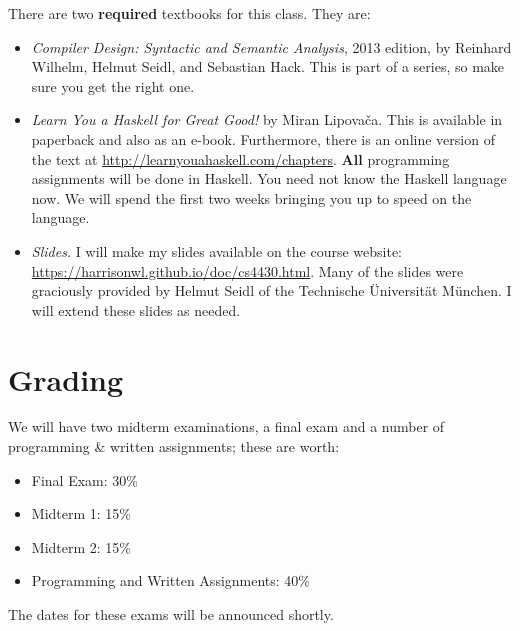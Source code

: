 \documentclass[11pt]{article}
\begin{document}
There are two {\bf{required}} textbooks for this class. They are:
\begin{itemize}
\item {\it Compiler Design: Syntactic and Semantic Analysis}, 2013 edition, by Reinhard Wilhelm, Helmut Seidl, and Sebastian Hack. This is part of a series, so make sure you get the right one.

\item {\it Learn You a Haskell for Great Good!} by Miran Lipova\v{c}a. This is available in  paperback and also as an e-book. Furthermore,  there is an online version of the text at \url{http://learnyouahaskell.com/chapters}. {\bf All} programming assignments will be done in Haskell. You need not know the Haskell language now. We will spend the first two weeks bringing you up to speed on the language.

\item {\it Slides.} I will make my slides available on the course website: \url{https://harrisonwl.github.io/doc/cs4430.html}. Many of the slides were graciously provided by Helmut Seidl of the Technische \"{U}niversit\"{a}t M\"{u}nchen. I will extend these slides as needed.
\end{itemize}

%



\section{Grading}

We will have two midterm examinations, a final exam and a number of programming \& written assignments; these are worth:
\begin{itemize}
\item Final Exam: 30\%
\item Midterm 1: 15\%
\item Midterm 2: 15\%
\item Programming and Written Assignments: 40\%
\end{itemize}
The dates for these exams will be announced shortly.
\end{document}
